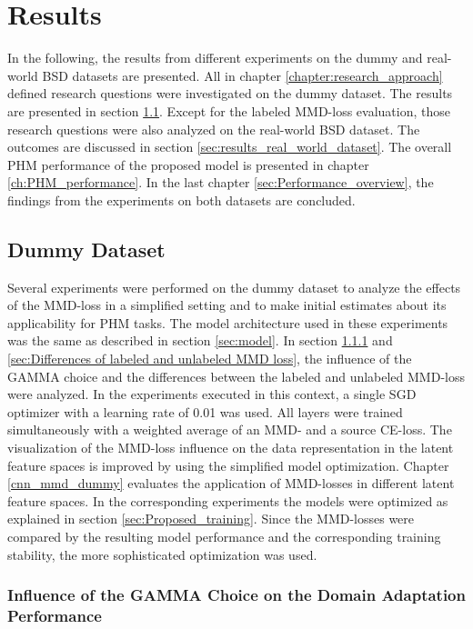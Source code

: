 \chapter{Results}\label{sec:results}

In the following, the results from different experiments on the dummy and real-world BSD datasets are presented. All in chapter \ref{chapter:research_approach} defined research questions were investigated on the dummy dataset. The results are presented in section \ref{sec:results_dummy_dataset}. Except for the labeled MMD-loss evaluation, those research questions were also analyzed on the real-world BSD dataset. The outcomes are discussed in section \ref{sec:results_real_world_dataset}. The overall PHM performance of the proposed model is presented in chapter \ref{ch:PHM_performance}. In the last chapter \ref{sec:Performance_overview}, the findings from the experiments on both datasets are concluded.




\section{Dummy Dataset}\label{sec:results_dummy_dataset}
Several experiments were performed on the dummy dataset to analyze the effects of the MMD-loss in a simplified setting and to make initial estimates about its applicability for PHM tasks. The model architecture used in these experiments was the same as described in section \ref{sec:model}. In section \ref{sec:Balancing Cross-Entropy and MMD loss} and \ref{sec:Differences of labeled and unlabeled MMD loss}, the influence of the GAMMA choice and the differences between the labeled and unlabeled MMD-loss were analyzed. In the experiments executed in this context, a single SGD optimizer with a learning rate of 0.01 was used. All layers were trained simultaneously with a weighted average of an MMD- and a source CE-loss. The visualization of the MMD-loss influence on the data representation in the latent feature spaces is improved by using the simplified model optimization. Chapter \ref{cnn_mmd_dummy} evaluates the application of MMD-losses in different latent feature spaces. In the corresponding experiments the models were optimized as explained in section \ref{sec:Proposed_training}. Since the MMD-losses were compared by the resulting model performance and the corresponding training stability, the more sophisticated optimization was used.

\subsection{Influence of the GAMMA Choice on the Domain Adaptation Performance} \label{sec:Balancing Cross-Entropy and MMD loss}

